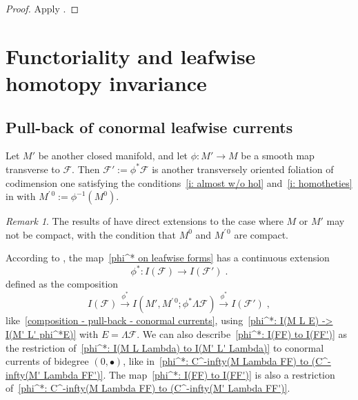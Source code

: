 \documentclass{memo-l}
\theoremstyle{plain}
\theoremstyle{definition}
\theoremstyle{remark}
\newtheorem{rem}[thm]{Remark}
\newcommand{\FF}{\mathcal{F}}
\numberwithin{section}{chapter}
\numberwithin{equation}{section}%
\begin{document}
\begin{proof}
Apply .
\end{proof}



\section{Functoriality and leafwise homotopy invariance}\label{s: functor and leafwise homotopy inv}


\subsection{Pull-back of conormal leafwise currents}\label{ss: pull-back of leafwise conormal currents}

Let $M'$ be another closed manifold, and let $\phi:M'\to M$ be a smooth map transverse to $\FF$. Then $\FF':=\phi^*\FF$ is another transversely oriented foliation of codimension one satisfying the conditions~\ref{i: almost w/o hol} and~\ref{i: homotheties} in  with $M^{\prime\,0}:=\phi^{-1}(M^0)$.

\begin{rem}\label{r: phi - extension - non-compact}
The results of  have direct extensions to the case where $M$ or $M'$ may not be compact, with the condition that $M^0$ and $M^{\prime\,0}$ are compact.
\end{rem}

According to , the map~\eqref{phi^* on leafwise forms} has a continuous extension
\begin{equation}\label{phi^*: I(FF) to I(FF')}
\phi^*:I(\FF)\to I(\FF')\;.
\end{equation}
defined as the composition
\begin{equation}\label{pull-back - decomposition - conormal - leafwise}
I(\FF) \xrightarrow{\phi^*} I(M',M^{\prime\,0};\phi^*\Lambda\FF) \xrightarrow{\phi^*} I(\FF')\;,
\end{equation}
like~\eqref{composition - pull-back - conormal currents}, using~\eqref{phi^*: I(M L E) -> I(M' L' phi^*E)} with $E=\Lambda\FF$. We can also describe~\eqref{phi^*: I(FF) to I(FF')} as the restriction of~\eqref{phi^*: I(M L Lambda) to I(M' L' Lambda)} to conormal currents of bidegree $(0,\bullet)$, like in~\eqref{phi^*: C^-infty(M Lambda FF) to (C^-infty(M' Lambda FF')}. The map~\eqref{phi^*: I(FF) to I(FF')} is also a restriction of~\eqref{phi^*: C^-infty(M Lambda FF) to (C^-infty(M' Lambda FF')}. 
\end{document}
